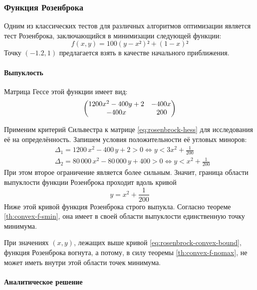 \subsubsection{Функция Розенброка}

Одним из классических тестов для различных алгоритмов оптимизации
является тест Розенброка, заключающийся в минимизации следующей
функции:
\begin{equation}
  \label{eq:rosenbrock}
  f(x, y) = 100(y - x²)² + (1 - x)²
\end{equation}
Точку $(-1.2, 1)$ предлагается взять в качестве начального
приближения.

\paragraph{Выпуклость}

Матрица Гессе этой функции имеет вид:
\begin{equation}
  \label{eq:rosenbrock-hess}
  \begin{pmatrix}
    1200x^2-400y+2 & -400x \\
    -400x & \phm200\phantom{x}
  \end{pmatrix}
\end{equation}

Применим критерий Сильвестра к матрице \eqref{eq:rosenbrock-hess} для
исследования её на определённость. Запишем условия положительности её
угловых миноров:
\begin{align*}
  &\Delta_1 = 1200\,x^2-400\,y+2 > 0 \iff y < 3x^2+\frac{1}{200}\\
  &\Delta_2 = 80\,000\,x^2-80\,000\,y+400 > 0 \iff y < x^2+\frac{1}{200}
\end{align*}
При этом второе ограничение является более сильным. Значит, граница
области выпуклости функции Розенброка проходит вдоль кривой
\begin{equation}
  \label{eq:rosenbrock-convex-bound}
  y = x^2 +\frac{1}{200}
\end{equation}
Ниже этой кривой функция Розенброка строго выпукла. Согласно теореме
\ref{th:convex-f-smin}, она имеет в своей области выпуклости
единственную точку минимума.

При значениях $(x, y)$, лежащих выше кривой
\eqref{eq:rosenbrock-convex-bound}, функция Розенброка вогнута, а
потому, в силу теоремы \ref{th:convex-f-nomax}, не может иметь внутри
этой области точек минимума.

\paragraph{Аналитическое решение}

